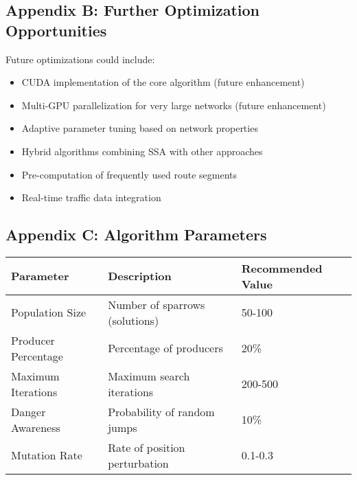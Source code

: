 \documentclass[conference]{IEEEtran}
\begin{document}
\subsection{Appendix B: Further Optimization Opportunities}
Future optimizations could include:
\begin{itemize}
    \item CUDA implementation of the core algorithm (future enhancement)
    \item Multi-GPU parallelization for very large networks (future enhancement)
    \item Adaptive parameter tuning based on network properties
    \item Hybrid algorithms combining SSA with other approaches
    \item Pre-computation of frequently used route segments
    \item Real-time traffic data integration
\end{itemize}

\subsection{Appendix C: Algorithm Parameters}
\begin{center}
\begin{tabular}{|l|p{7.5cm}|l|}
\hline
\textbf{Parameter} & \textbf{Description} & \textbf{Recommended Value} \\
\hline
Population Size & Number of sparrows (solutions) & 50-100 \\
\hline
Producer Percentage & Percentage of producers & 20\% \\
\hline
Maximum Iterations & Maximum search iterations & 200-500 \\
\hline
Danger Awareness & Probability of random jumps & 10\% \\
\hline
Mutation Rate & Rate of position perturbation & 0.1-0.3 \\
\hline
\end{tabular}
\end{center}
\end{document}
